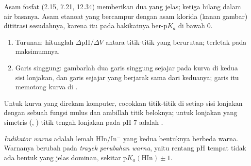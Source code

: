 Asam fosfat (2.15, 7.21, 12.34) memberikan dua  yang jelas;
 ketiga hilang dalam air basanya. Asam etanoat yang
bercampur dengan asam klorida (kanan gambar) dititrasi sesudahnya, karena
 itu pada hakikatnya ber-$\mathrm{p}K_a$ di bawah 0.

\begin{method}\label{met:b1:titration-methods:derivative}
\begin{enumerate}
  \item Turunan: hitunglah $\Delta\mathrm{pH}/\Delta V$ antara
        titik-titik yang berurutan;  terletak pada maksimumnya.
  \item Garis singgung: gambarlah dua garis singgung sejajar pada kurva di
        kedua sisi lonjakan, dan garis sejajar yang berjarak sama dari
        keduanya; garis itu memotong kurva di .
\end{enumerate}
\end{method}

\begin{method}\label{met:b1:titration-methods:tangents}
Untuk kurva yang direkam komputer, cocokkan titik-titik di setiap sisi
lonjakan dengan sebuah fungsi mulus dan ambillah titik beloknya; untuk
lonjakan yang simetris (, ) titik tengah lonjakan pada
pH 7 adalah .
\end{method}

\begin{definition}\label{def:b1:titration-methods:indicator}
\emph{Indikator warna} adalah 
lemah HIn/In$^-$ yang kedua bentuknya berbeda warna. Warnanya berubah
pada \emph{trayek perubahan warna}, yaitu
rentang pH tempat tidak ada bentuk yang jelas dominan, sekitar
$\mathrm{p}K_{a}(\mathrm{HIn}) \pm 1$.
\end{definition}


